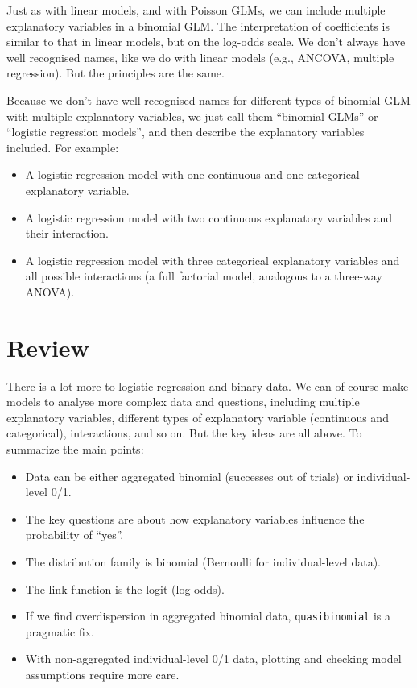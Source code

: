 \documentclass[
  letterpaper,
  8pt,
  a4paper]{book}
\providecommand{\tightlist}{%
  \setlength{\itemsep}{0pt}\setlength{\parskip}{0pt}}
\begin{document}
Just as with linear models, and with Poisson GLMs, we can include
multiple explanatory variables in a binomial GLM. The interpretation of
coefficients is similar to that in linear models, but on the log-odds
scale. We don't always have well recognised names, like we do with
linear models (e.g., ANCOVA, multiple regression). But the principles
are the same.

Because we don't have well recognised names for different types of
binomial GLM with multiple explanatory variables, we just call them
``binomial GLMs'' or ``logistic regression models'', and then describe
the explanatory variables included. For example:

\begin{itemize}
\tightlist
\item
  A logistic regression model with one continuous and one categorical
  explanatory variable.
\item
  A logistic regression model with two continuous explanatory variables
  and their interaction.
\item
  A logistic regression model with three categorical explanatory
  variables and all possible interactions (a full factorial model,
  analogous to a three-way ANOVA).
\end{itemize}

\section*{Review}\label{review-7}


There is a lot more to logistic regression and binary data. We can of
course make models to analyse more complex data and questions, including
multiple explanatory variables, different types of explanatory variable
(continuous and categorical), interactions, and so on. But the key ideas
are all above. To summarize the main points:

\begin{itemize}
\tightlist
\item
  Data can be either aggregated binomial (successes out of trials) or
  individual-level 0/1.
\item
  The key questions are about how explanatory variables influence the
  probability of ``yes''.
\item
  The distribution family is binomial (Bernoulli for individual-level
  data).
\item
  The link function is the logit (log-odds).
\item
  If we find overdispersion in aggregated binomial data,
  \texttt{quasibinomial} is a pragmatic fix.
\item
  With non-aggregated individual-level 0/1 data, plotting and checking
  model assumptions require more care.
\end{itemize}
\end{document}
